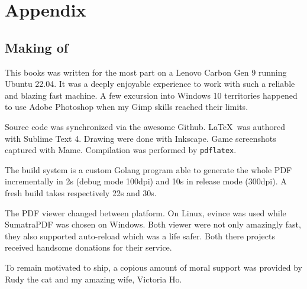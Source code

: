 \chapter{Appendix} 

\section{Making of}

This books was written for the most part on a Lenovo Carbon Gen 9 running Ubuntu 22.04. It was a deeply enjoyable experience to work with such a reliable and blazing fast machine. A few excursion into Windows 10 territories happened to use Adobe Photoshop when my Gimp skills reached their limits. 

Source code was synchronized via the awesome Github. \LaTeX\ was authored with Sublime Text 4. Drawing were done with Inkscape. Game screenshots captured with Mame. Compilation was performed by \texttt{pdflatex}.

The build system is a custom Golang program able to generate the whole PDF incrementally in 2s (debug mode 100dpi) and 10s in release mode (300dpi). A fresh build takes respectively 22s and 30s.

The PDF viewer changed between platform. On Linux, evince was used while SumatraPDF was chosen on Windows. Both viewer were not only amazingly fast, they also supported auto-reload which was a life safer. Both there projects received handsome donations for their service.

To remain motivated to ship, a copious amount of moral support was provided by Rudy the cat and my amazing wife, Victoria Ho.
